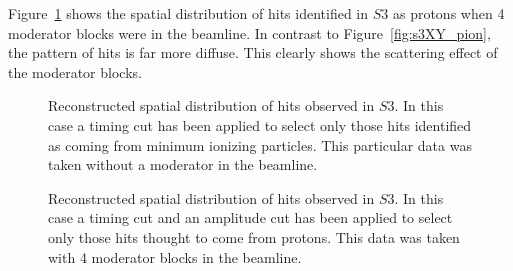 Figure~\ref{fig:s3XY_proton} shows the spatial distribution of hits identified in $\mathit{S3}$ as protons when 4 moderator blocks were in the beamline.
In contrast to Figure~\ref{fig:s3XY_pion}, the pattern of hits is far more diffuse.
This clearly shows the scattering effect of the moderator blocks.


\begin{figure}[t]
  \begin{minipage}[t]{0.49\textwidth}
    \centering
    \begin{adjustbox}{max totalsize={\textwidth}{.5\textheight},center}
      
    \end{adjustbox}
    \caption{Reconstructed spatial distribution of hits observed in $\mathit{S3}$. In this case a timing cut has been applied to select only those hits identified as coming from minimum ionizing particles. This particular data was taken without a moderator in the beamline.}
    \label{fig:s3XY_pion}
  \end{minipage} 	
  \hfill
  \begin{minipage}[t]{0.49\textwidth}
    \centering
    \begin{adjustbox}{max totalsize={\textwidth}{.5\textheight},center}
      
    \end{adjustbox}
    \caption{Reconstructed spatial distribution of hits observed in $\mathit{S3}$. In this case a timing cut and an amplitude cut has been applied to select only those hits thought to come from protons. This data was taken with 4 moderator blocks in the beamline.}
    \label{fig:s3XY_proton}
  \end{minipage}
\end{figure}


